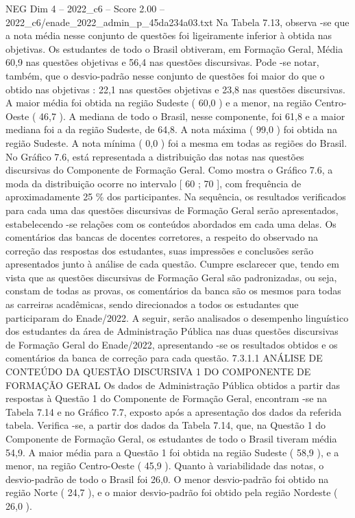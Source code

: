 \begin{textsample}{NEG Dim 4 – 2022\_c6 – Score 2.00 – 2022\_c6/enade\_2022\_admin\_p\_45da234a03.txt}
Na Tabela 7.13, observa -se que a nota média nesse conjunto de questões foi ligeiramente inferior à obtida nas objetivas.
Os estudantes de todo o Brasil obtiveram, em Formação Geral, Média 60,9 nas questões objetivas e 56,4 nas questões discursivas.
Pode -se notar, também, que o desvio-padrão nesse conjunto de questões foi maior do que o obtido nas objetivas : 22,1 nas questões objetivas e 23,8 nas questões discursivas.
A maior média foi obtida na região Sudeste ( 60,0 ) e a menor, na região Centro-Oeste ( 46,7 ).
A mediana de todo o Brasil, nesse componente, foi 61,8 e a maior mediana foi a da região Sudeste, de 64,8.
A nota máxima ( 99,0 ) foi obtida na região Sudeste.
A nota mínima ( 0,0 ) foi a mesma em todas as regiões do Brasil.
No Gráfico 7.6, está representada a distribuição das notas nas questões discursivas do Componente de Formação Geral.
Como mostra o Gráfico 7.6, a moda da distribuição ocorre no intervalo [ 60 ; 70 ], com frequência de aproximadamente 25 \% dos participantes.
Na sequência, os resultados verificados para cada uma das questões discursivas de Formação Geral serão apresentados, estabelecendo -se relações com os conteúdos abordados em cada uma delas.
Os comentários das bancas de docentes corretores, a respeito do observado na correção das respostas dos estudantes, suas impressões e conclusões serão apresentados junto à análise de cada questão.
Cumpre esclarecer que, tendo em vista que as questões discursivas de Formação Geral são padronizadas, ou seja, constam de todas as provas, os comentários da banca são os mesmos para todas as carreiras acadêmicas, sendo direcionados a todos os estudantes que participaram do Enade/2022.
A seguir, serão analisados o desempenho linguístico dos estudantes da área de Administração Pública nas duas questões discursivas de Formação Geral do Enade/2022, apresentando -se os resultados obtidos e os comentários da banca de correção para cada questão. 7.3.1.1 ANÁLISE DE CONTEÚDO DA QUESTÃO DISCURSIVA 1 DO COMPONENTE DE FORMAÇÃO GERAL Os dados de Administração Pública obtidos a partir das respostas à Questão 1 do Componente de Formação Geral, encontram -se na Tabela 7.14 e no Gráfico 7.7, exposto após a apresentação dos dados da referida tabela.
Verifica -se, a partir dos dados da Tabela 7.14, que, na Questão 1 do Componente de Formação Geral, os estudantes de todo o Brasil tiveram média 54,9.
A maior média para a Questão 1 foi obtida na região Sudeste ( 58,9 ), e a menor, na região Centro-Oeste ( 45,9 ).
Quanto à variabilidade das notas, o desvio-padrão de todo o Brasil foi 26,0.
O menor desvio-padrão foi obtido na região Norte ( 24,7 ), e o maior desvio-padrão foi obtido pela região Nordeste ( 26,0 ).

\end{textsample}
